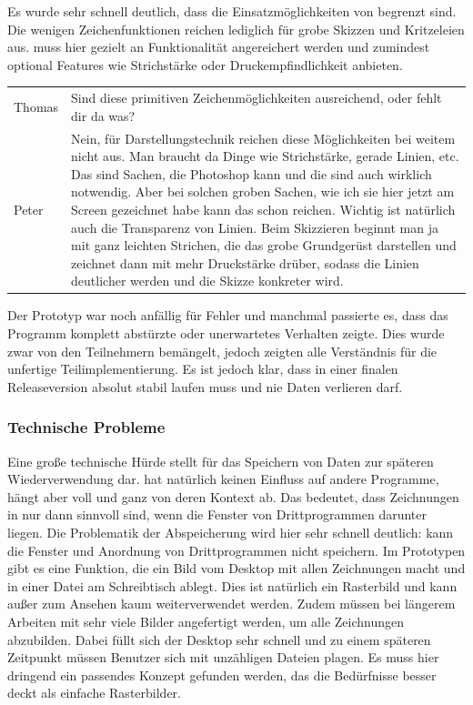 \medskip Es wurde sehr schnell deutlich, dass die Einsatzmöglichkeiten von \scribbler begrenzt sind. Die wenigen Zeichenfunktionen reichen lediglich für grobe Skizzen und Kritzeleien aus. \scribbler muss hier gezielt an Funktionalität angereichert werden und zumindest optional Features wie Strichstärke oder Druckempfindlichkeit anbieten.

\begin{extract}[Die Einsatzmöglichkeiten sind begrenzt.]
	{
		\myfloatalign
		\begin{tabularx}{\textwidth}{p{1cm}X}
			Thomas & Sind diese primitiven Zeichenmöglichkeiten ausreichend, oder fehlt dir da was?\\
			Peter & Nein, für Darstellungstechnik reichen diese Möglichkeiten bei weitem nicht aus. Man braucht da Dinge wie Strichstärke, gerade Linien, etc. Das sind Sachen, die Photoshop kann und die sind auch wirklich notwendig. Aber bei solchen groben Sachen, wie ich sie hier jetzt am Screen gezeichnet habe kann das schon reichen. Wichtig ist natürlich auch die Transparenz von Linien. Beim Skizzieren beginnt man ja mit ganz leichten Strichen, die das grobe Grundgerüst darstellen und zeichnet dann mit mehr Druckstärke drüber, sodass die Linien deutlicher werden und die Skizze konkreter wird.
		\end{tabularx}
	}
\end{extract}

Der Prototyp war noch anfällig für Fehler und manchmal passierte es, dass das Programm komplett abstürzte oder unerwartetes Verhalten zeigte. Dies wurde zwar von den Teilnehmern bemängelt, jedoch zeigten alle Verständnis für die unfertige Teilimplementierung. Es ist jedoch klar, dass \scribbler in einer finalen Releaseversion absolut stabil laufen muss und nie Daten verlieren darf.


\subsubsection{Technische Probleme}
Eine große technische Hürde stellt für \scribbler das Speichern von Daten zur späteren Wiederverwendung dar. \scribbler hat natürlich keinen Einfluss auf andere Programme, hängt aber voll und ganz von deren Kontext ab. Das bedeutet, dass Zeichnungen in \scribbler nur dann sinnvoll sind, wenn die Fenster von Drittprogrammen darunter liegen. Die Problematik der Abspeicherung wird hier sehr schnell deutlich: \scribbler kann die Fenster und Anordnung von Drittprogrammen nicht speichern. Im Prototypen gibt es eine Funktion, die ein Bild vom Desktop mit allen Zeichnungen macht und in einer Datei am Schreibtisch ablegt. Dies ist natürlich ein Rasterbild und kann außer zum Ansehen kaum weiterverwendet werden. Zudem müssen bei längerem Arbeiten mit \scribbler sehr viele Bilder angefertigt werden, um alle Zeichnungen abzubilden. Dabei füllt sich der Desktop sehr schnell und zu einem späteren Zeitpunkt müssen Benutzer sich mit unzähligen Dateien plagen. Es muss hier dringend ein passendes Konzept gefunden werden, das die Bedürfnisse besser deckt als einfache Rasterbilder. 

